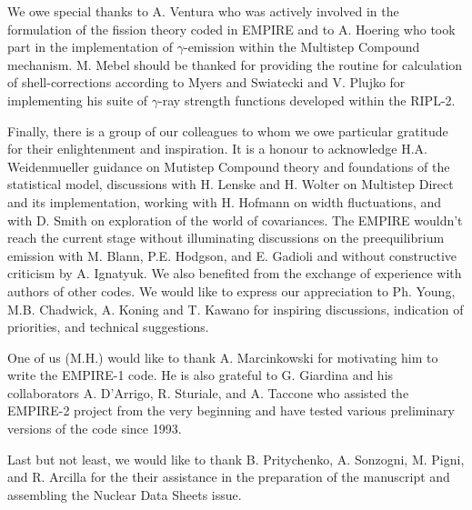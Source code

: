 \documentclass[twocolumn,amsmath,amssymb,10pt,groupedaddress,letter]{revtex4}
\begin{document}
We owe special thanks to A. Ventura who was actively involved in the formulation of the fission theory coded in EMPIRE and to A. Hoering who took part in the implementation of $\gamma$-emission within the Multistep Compound mechanism. M. Mebel should be thanked for providing the routine for calculation of shell-corrections according to Myers and Swiatecki and  V. Plujko for implementing his suite of $\gamma$-ray strength functions developed within the RIPL-2.

Finally, there is a group of our colleagues to whom we owe particular gratitude for their enlightenment and inspiration. It is a honour to acknowledge H.A. Weidenmueller guidance on Mutistep Compound theory and foundations of the statistical model, discussions with H. Lenske and H. Wolter on Multistep Direct and its implementation, working with H. Hofmann on width fluctuations, and with D. Smith on exploration of the world of covariances. The EMPIRE wouldn't reach the current stage without illuminating discussions on the preequilibrium emission with M. Blann, P.E. Hodgson, and E. Gadioli and without constructive criticism by A. Ignatyuk. We also benefited from the exchange of experience with  authors of other codes. We would like to express our appreciation to Ph. Young, M.B. Chadwick, A. Koning and T. Kawano for inspiring discussions, indication of priorities, and technical suggestions.

One of us (M.H.) would like to thank A. Marcinkowski for motivating him to write the EMPIRE-1 code. He is also grateful to G. Giardina and his collaborators A. D'Arrigo, R. Sturiale, and A. Taccone who assisted the EMPIRE-2 project from the very beginning and have tested various preliminary versions of the code since 1993.

Last but not least, we would like to thank B. Pritychenko, A. Sonzogni, M. Pigni, and R. Arcilla for the their assistance in the preparation of the manuscript and assembling the Nuclear Data Sheets issue.


\end{document}
